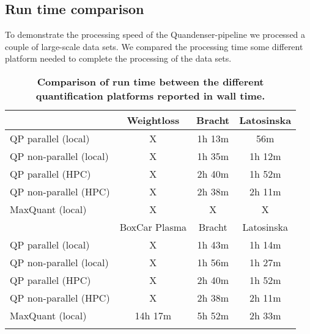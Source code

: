 \documentclass[11pt]{article}
\begin{document}
\subsection*{Run time comparison}
To demonstrate the processing speed of the Quandenser-pipeline we processed a couple of large-scale data sets. We compared the processing time some different platform needed to complete the processing of the data sets.
\begin{table}[!h]
  \begin{center}
  \caption{\textbf{Comparison of run time between the different quantification platforms reported in wall time.}}
  \label{table:walltime}
\begin{tabular}{lccc}

& Weightloss & Bracht & Latosinska \\ \hline \hline
QP parallel (local) & X & 1h 13m & 56m \\
QP non-parallel (local) & X & 1h 35m & 1h 12m \\
QP parallel (HPC) & X & 2h 40m & 1h 52m \\  %
QP non-parallel (HPC) & X & 2h 38m & 2h 11m \\  %
MaxQuant (local) & X & X & X \\

\begin{comment}
& BoxCar Plasma & Bracht & Latosinska \\ \hline \hline
QP parallel (local) & X & 1h 43m & 1h 14m \\
QP non-parallel (local) & X & 1h 56m & 1h 27m \\
QP parallel (HPC) & X & 2h 40m & 1h 52m \\
QP non-parallel (HPC) & X & 2h 38m & 2h 11m \\
MaxQuant (local) & 14h 17m & 5h 52m & 2h 33m \\
\end{comment}

\end{tabular}
\end{center}
\end{table}
\end{document}
